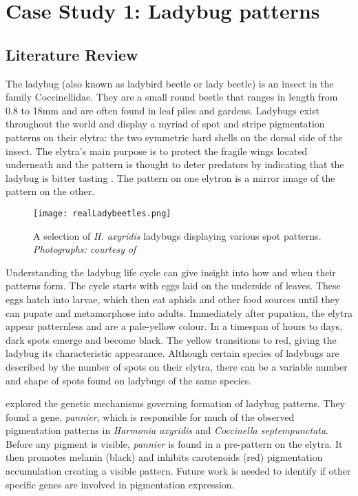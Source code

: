 \chapter{Case Study 1: Ladybug patterns}

\section{Literature Review}
The ladybug (also known as ladybird beetle or lady beetle) is an insect in the family Coccinellidae. They are a small round beetle that ranges in length from 0.8 to 18mm \citep{King1996} and are often found in leaf piles and gardens. Ladybugs exist throughout the world and display a myriad of spot and stripe pigmentation patterns on their elytra: the two symmetric hard shells on the dorsal side of the insect. The elytra's main purpose is to protect the fragile wings located underneath and the pattern is thought to deter predators by indicating that the ladybug is bitter tasting \citep{King1996}. The pattern on one elytron is a mirror image of the pattern on the other. 

\begin{figure}[ht]
	\centering
	\texttt{[image: realLadybeetles.png]}
	\caption{A selection of \textit{H. axyridis} ladybugs displaying various spot patterns. \textit{Photographs: courtesy of \citet{entomart2019}}}
	\label{fig:realLadyBugPatterns}
\end{figure}

Understanding the ladybug life cycle can give insight into how and when their patterns form. The cycle starts with eggs laid on the underside of leaves. These eggs hatch into larvae, which then eat aphids and other food sources until they can pupate and metamorphose into adults. Immediately after pupation, the elytra appear patternless and are a pale-yellow colour. In a timespan of hours to days, dark spots emerge and become black. The yellow transitions to red, giving the ladybug its characteristic appearance. Although certain species of ladybugs are described by the number of spots on their elytra, there can be a variable number and shape of spots found on ladybugs of the same species.

\citet{Ando2018} explored the genetic mechanisms governing formation of ladybug patterns. They found a gene, \textit{pannier}, which is responsible for much of the observed pigmentation patterns in \textit{Harmonia axyridis} and \textit{Coccinella septempunctata}. Before any pigment is visible, \textit{pannier} is found in a pre-pattern on the elytra. It then promotes melanin (black) and inhibits carotenoids (red) pigmentation accumulation creating a visible pattern. Future work is needed to identify if other specific genes are involved in pigmentation expression.

